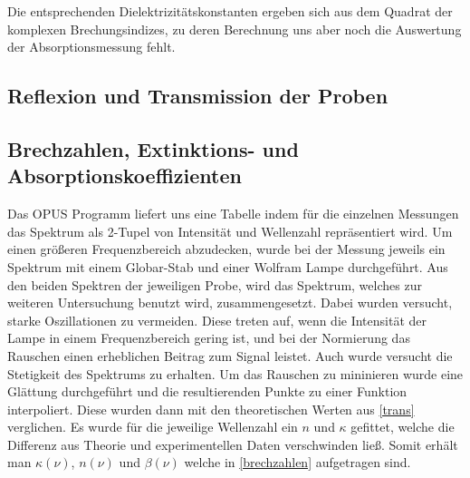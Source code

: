 \documentclass[paper=a4,fontsize=10pt,DIV=18,twocolumn,parskip=half]{scrartcl}
\numberwithin{equation}{section}    %
\begin{document}
Die entsprechenden Dielektrizitätskonstanten ergeben sich aus dem Quadrat der 
komplexen Brechungsindizes, zu deren Berechnung uns aber noch die Auswertung der 
Absorptionsmessung fehlt.

\subsection{Reflexion und Transmission der Proben}

\subsection{Brechzahlen, Extinktions- und Absorptionskoeffizienten}

Das OPUS Programm liefert uns eine Tabelle indem für die einzelnen Messungen das 
Spektrum als 2-Tupel von Intensität und Wellenzahl repräsentiert wird. Um einen größeren Frequenzbereich 
abzudecken, wurde bei der Messung jeweils ein Spektrum mit einem Globar-Stab und 
einer Wolfram Lampe durchgeführt. Aus den beiden Spektren der jeweiligen Probe, 
wird das Spektrum, welches zur weiteren Untersuchung benutzt wird, 
zusammengesetzt. Dabei wurden versucht, starke Oszillationen zu vermeiden. Diese 
treten auf, wenn die Intensität der Lampe in einem Frequenzbereich gering ist, 
und bei der Normierung das Rauschen einen erheblichen Beitrag zum Signal 
leistet. Auch wurde versucht die Stetigkeit des Spektrums zu erhalten. Um das 
Rauschen zu mininieren wurde eine Glättung durchgeführt und die resultierenden 
Punkte zu einer Funktion interpoliert. Diese wurden dann mit den theoretischen 
Werten aus \cref{trans} verglichen. Es wurde für die jeweilige Wellenzahl ein $n$ und 
$\kappa$ gefittet, welche die Differenz aus Theorie und experimentellen Daten 
verschwinden ließ. Somit erhält man $\kappa(\nu)$, $n(\nu)$ und $\beta(\nu)$ 
welche in \cref{brechzahlen} aufgetragen sind. 
\end{document}
